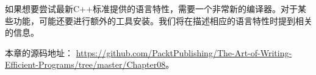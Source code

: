 如果想要尝试最新C++标准提供的语言特性，需要一个非常新的编译器。对于某些功能，可能还要进行额外的工具安装。我们将在描述相应的语言特性时提到相关的信息。

本章的源码地址： \url{https://github.com/PacktPublishing/The-Art-of-Writing-Efficient-Programs/tree/master/Chapter08}。